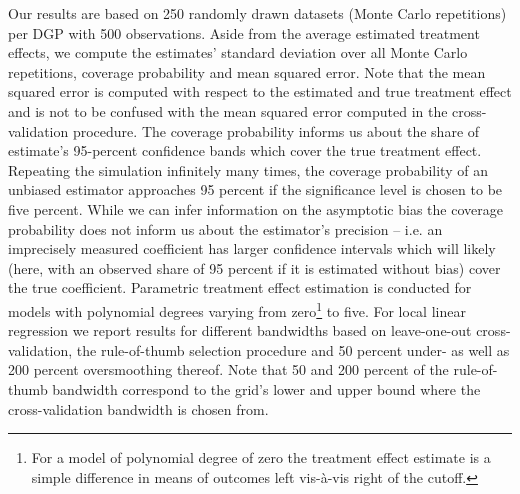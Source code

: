 \documentclass[11pt, a4paper, leqno]{article}
\numberwithin{equation}{section}
\numberwithin{figure}{section}
\numberwithin{table}{section}
\numberwithin{algorithm}{section}
\begin{document}
Our results are based on 250 randomly drawn datasets (Monte Carlo repetitions) per DGP with 500 observations. Aside from the average estimated treatment effects, we compute the estimates' standard deviation over all Monte Carlo repetitions, coverage probability and mean squared error. Note that the mean squared error is computed with respect to the estimated and true treatment effect and is not to be confused with the mean squared error computed in the cross-validation procedure. The coverage probability informs us about the share of estimate's 95-percent confidence bands which cover the true treatment effect. Repeating the simulation infinitely many times, the coverage probability of an unbiased estimator approaches 95 percent if the significance level is chosen to be five percent. While we can infer information on the asymptotic bias the coverage probability does not inform us about the estimator's precision -- i.e. an imprecisely measured coefficient has larger confidence intervals which will likely (here, with an observed share of 95 percent if it is estimated without bias) cover the true coefficient. Parametric treatment effect estimation is conducted for models with polynomial degrees varying from zero\footnote{For a model of polynomial degree of zero the treatment effect estimate is a simple difference in means of outcomes left vis-à-vis right of the cutoff.} to five. For local linear regression we report results for different bandwidths based on leave-one-out cross-validation, the rule-of-thumb selection procedure and 50 percent under- as well as 200 percent oversmoothing thereof. Note that 50 and 200 percent of the rule-of-thumb bandwidth correspond to the grid's lower and upper bound where the cross-validation bandwidth is chosen from.
\end{document}

